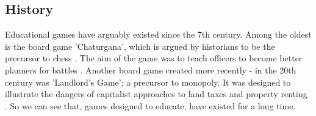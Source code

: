 \documentclass[a4paper,11.5pt]{report}
\numberwithin{figure}{section}
\numberwithin{table}{section}
\numberwithin{equation}{section}
\numberwithin{equation}{section}
\begin{document}


\subsection{History}

Educational games have arguably existed since the 7th century. Among the oldest is the board game 'Chaturgana', which is argued by historians to be the precursor to chess \citep{Wilkinson2016}. The aim of the game was to teach officers to become better planners for battles \citep{Wilkinson2016}. Another board game created more recently - in the 20th century was 'Landlord's Game'; a precursor to monopoly. It was designed to illustrate the dangers of capitalist approaches to land taxes and property renting \citep{Wilkinson2016}. So we can see that, games designed to educate, have existed for a long time.




\end{document}
